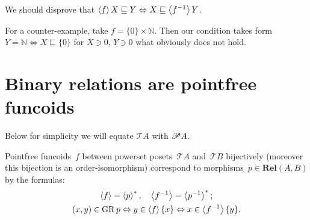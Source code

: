 We should disprove that $\left\langle f\right\rangle X \sqsubseteq Y \Leftrightarrow X
\sqsubseteq \left\langle f^{- 1}\right\rangle Y$.

For a counter-example, take $f = \{ 0 \} \times \mathbb{N}$. Then our
condition takes form $Y=\mathbb{N} \Leftrightarrow X \sqsubseteq \{ 0 \}$ for $X\ni 0$, $Y\ni 0$
what obviously does not hold.

\section{Binary relations are pointfree funcoids}

Below for simplicity we will equate $\mathscr{T}A$ with $\mathscr{P} A$.

\begin{thm}
\label{pf-rel}Pointfree funcoids~$f$ between powerset posets~$\mathscr{T}A$
and~$\mathscr{T}B$ bijectively (moreover this bijection is an order-isomorphism)
correspond to morphisms~$p\in\mathbf{Rel}(A,B)$ by the formulas:
\begin{gather}
\left\langle f\right\rangle=\left\langle p\right\rangle ^{\ast},\quad\left\langle f^{-1}\right\rangle=\left\langle p^{-1}\right\rangle ^{\ast};\label{pf-rel-f}\\
(x,y)\in\operatorname{GR} p\Leftrightarrow y\in\left\langle f\right\rangle\{x\}\Leftrightarrow x\in\left\langle f^{-1}\right\rangle\{y\}.\label{pf-rel-gr}
\end{gather}
\end{thm}
